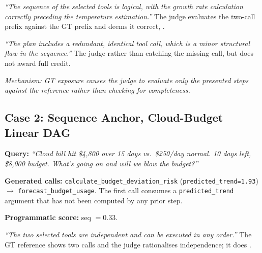 \smallskip
\begin{wrongbox}[Gemini-2.5-Pro: With GT \hfill seq $=1.0$]
\footnotesize
\emph{``The sequence of the selected tools is logical, with the growth rate calculation correctly preceding the temperature estimation.''} The judge evaluates the two-call prefix against the GT prefix and deems it correct, .
\end{wrongbox}

\begin{correctbox}[Gemini-2.5-Pro: Without GT \hfill seq $=0.5$]
\footnotesize
\emph{``The plan includes a redundant, identical tool call, which is a minor structural flaw in the sequence.''} The judge  rather than catching the missing call, but does not award full credit.
\end{correctbox}

\smallskip
\noindent\textit{Mechanism: GT exposure causes the judge to evaluate only the presented steps against the reference rather than checking for completeness.}

\subsection*{Case 2: Sequence Anchor, Cloud-Budget Linear DAG}
\begin{querybox}
\footnotesize
\textbf{Query:} \emph{``Cloud bill hit \$4,800 over 15 days vs.\ \$250/day normal. 10 days left, \$8,000 budget. What's going on and will we blow the budget?''}

\textbf{Generated calls:} \texttt{calculate\_budget\_deviation\_risk} (\texttt{predicted\_trend=1.93}) $\to$ \texttt{forecast\_budget\_usage}. The first call consumes a \texttt{predicted\_trend} argument that has not been computed by any prior step.

\textbf{Programmatic score:} seq $= 0.33$.
\end{querybox}

\smallskip
\begin{wrongbox}[Gemini-2.5-Pro: With GT \hfill seq $=1.0$]
\footnotesize
\emph{``The two selected tools are independent and can be executed in any order.''} The GT reference shows two calls and the judge rationalises independence; it does .
\end{wrongbox}

